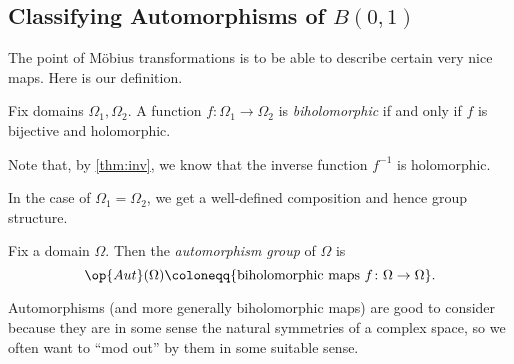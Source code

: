 \documentclass[../notes.tex]{subfiles}
\begin{document}
\subsection{Classifying Automorphisms of \texorpdfstring{$B(0,1)$}{B(0,1)}}
The point of M\"obius transformations is to be able to describe certain very nice maps. Here is our definition.
\begin{definition}[Biholomorphic]
	Fix domains $\Omega_1,\Omega_2$. A function $f\colon\Omega_1\to\Omega_2$ is \textit{biholomorphic} if and only if $f$ is bijective and holomorphic.
\end{definition}
Note that, by \autoref{thm:inv}, we know that the inverse function $f^{-1}$ is holomorphic.

In the case of $\Omega_1=\Omega_2$, we get a well-defined composition and hence group structure.
\begin{definition}[Automorphism]
	Fix a domain $\Omega$. Then the \textit{automorphism group} of $\Omega$ is
	\[\op{Aut}(\Omega)\coloneqq\{\text{biholomorphic maps }f\colon\Omega\to\Omega\}.\]
\end{definition}
Automorphisms (and more generally biholomorphic maps) are good to consider because they are in some sense the natural symmetries of a complex space, so we often want to ``mod out'' by them in some suitable sense.
\end{document}
